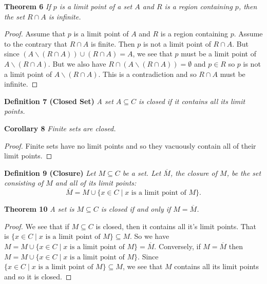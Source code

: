 \documentclass{article}
\begin{document}
\begin{flushleft}
\textbf{Theorem 6}
\textsl{If $p$ is a limit point of a set $A$ and $R$ is a region containing $p$, then the set $R \cap A$ is infinite.}
\begin{proof}
Assume that $p$ is a limit point of $A$ and $R$ is a region containing $p$. Assume to the contrary that $R \cap A$ is finite. Then $p$ is not a limit point of $R \cap A$. But since $(A \backslash (R \cap A)) \cup (R \cap A) = A$, we see that $p$ must be a limit point of $A \backslash (R \cap A)$. But we also have $R \cap (A \backslash (R \cap A)) = \emptyset$ and $p \in R$ so $p$ is not a limit point of $A \backslash (R \cap A)$. This is a contradiction and so $R \cap A$ must be infinite.
\end{proof}

\textbf{Definition 7 (Closed Set)}
\textsl{A set $A \subseteq C$ is closed if it contains all its limit points.}\newline

\textbf{Corollary 8}
\textsl{Finite sets are closed.}
\begin{proof}
Finite sets have no limit points and so they vacuously contain all of their limit points.
\end{proof}

\textbf{Definition 9 (Closure)}
\textsl{Let $M \subseteq C$ be a set. Let $\overline{M}$, the closure of $M$, be the set consisting of $M$ and all of its limit points:
\[
\overline{M} = M \cup \{x \in C \mid x \text{ is a limit point of } M\}.
\]}

\textbf{Theorem 10}
\textsl{A set is $M \subseteq C$ is closed if and only if $M=\overline{M}$.}
\begin{proof}
We see that if $M \subseteq C$ is closed, then it contains all it's limit points. That is $\{x \in C \mid x \text{ is a limit point of }M\} \subseteq M$. So we have $M=M \cup \{x \in C \mid x \text{ is a limit point of }M\} = \overline{M}$. Conversely, if $M=\overline{M}$ then $M = M \cup \{x \in C \mid x \text{ is a limit point of }M\}$. Since $\{ x \in C \mid x \text{ is a limit point of }M\} \subseteq M$, we see that $M$ contains all its limit points and so it is closed.
\end{proof}


\end{flushleft}
\end{document}
